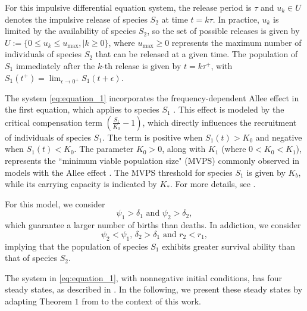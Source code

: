 \documentclass[10pt,letterpaper]{article}
\begin{document}
For this impulsive differential equation system, the release period is $\tau$ and $u_k \in U$ denotes the impulsive release of species $S_2$ at time $t = k\tau$. In practice, $u_k$ is limited by the availability of species $S_2$, so the set of possible releases is given by $U:= \{ 0 \leq u_k \leq u_{\text{max}}, \mid k \geq 0 \}$, where $u_{\text{max}} \geq 0$ represents the maximum number of individuals of species $S_2$ that can be released at a given time. The population of $S_1$ immediately after the $k$-th release is given by $t = k\tau^+$, with $S_1(t^+) = \lim_{\epsilon \to 0^+} S_1(t + \epsilon)$.

The system \eqref{eq:equation_1} incorporates the frequency-dependent Allee effect in the first equation, which applies to species $S_1$ \cite{campo2017optimalW10,Campo2017}. This effect is modeled by the critical compensation term $\left(\frac{S_1}{K_0} - 1\right)$, which directly influences the recruitment of individuals of species $S_1$. The term is positive when $S_1(t) > K_0$ and negative when $S_1(t) < K_0$. The parameter $K_0 > 0$, along with $K_1$ (where $0 < K_0 < K_1$), represents the ``minimum viable population size" (MVPS) commonly observed in models with the Allee effect \cite{barton2011spatialA1, clements2011biologyA2,HASTINGS2013175PopulationDynamics,kanarek2015overcomingA9,stephens1999alleeA7, ufuktepe2022discreteA4}. The MVPS threshold for species $S_1$ is given by $K_b$, while its carrying capacity is indicated by $K_*$. For more details, see \cite{Campo2017}.

For this model, we consider
\begin{equation}\label{eq:equation_3}
    \psi_1 > \delta_1 \mbox{ and } \psi_2 > \delta_2,
\end{equation}
which guarantee a larger number of births than deaths. In addiction, we consider
\begin{equation}\label{eq:equation_4}
    \psi_2 < \psi_1, \, \delta_2 > \delta_1 \text{ and }r_2 < r_1,
\end{equation}
implying that the population of species $S_1$ exhibits greater survival ability than that of species $S_2$.

The system in \eqref{eq:equation_1}, with nonnegative initial conditions, has four steady states, as described in \cite{Campo2017}. In the following, we present these steady states by adapting Theorem $1$ from \cite{Campo2017} to the context of this work.
\end{document}
